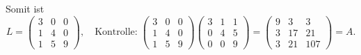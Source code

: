 \begin{beispiel}
Somit ist
\[
L=
\begin{pmatrix}
3&0&0\\
1&4&0\\
1&5&9
\end{pmatrix}
,\quad\text{Kontrolle:}\;
\begin{pmatrix}
3&0&0\\
1&4&0\\
1&5&9
\end{pmatrix}
\begin{pmatrix}
3&1&1\\
0&4&5\\
0&0&9
\end{pmatrix}
=\begin{pmatrix}
9&3&3\\
3&17&21\\
3&21&107
\end{pmatrix}=A.
\]
\end{beispiel}

